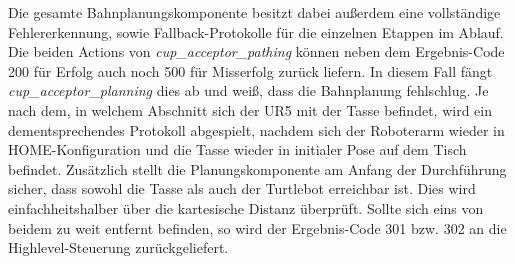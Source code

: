 \newline
Die gesamte Bahnplanungskomponente besitzt dabei außerdem eine vollständige Fehlererkennung, sowie Fallback-Protokolle für die einzelnen Etappen im Ablauf. Die beiden Actions von \textit{cup\_acceptor\_pathing} können neben dem Ergebnis-Code 200 für Erfolg auch noch 500 für Misserfolg zurück liefern. In diesem Fall fängt \textit{cup\_acceptor\_planning} dies ab und weiß, dass die Bahnplanung fehlschlug. Je nach dem, in welchem Abschnitt sich der UR5 mit der Tasse befindet, wird ein dementsprechendes Protokoll abgespielt, nachdem sich der Roboterarm wieder in HOME-Konfiguration und die Tasse wieder in initialer Pose auf dem Tisch befindet. Zusätzlich stellt die Planungskomponente am Anfang der Durchführung sicher, dass sowohl die Tasse als auch der Turtlebot erreichbar ist. Dies wird einfachheitshalber über die kartesische Distanz überprüft. Sollte sich eins von beidem zu weit entfernt befinden, so wird der Ergebnis-Code 301 bzw. 302 an die Highlevel-Steuerung zurückgeliefert.

